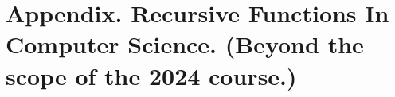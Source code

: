 %
%	
%	
%
\ifdefined\BOOK


\section{Appendix. Recursive Functions In Computer Science. (Beyond the scope of the 2024 course.)}





